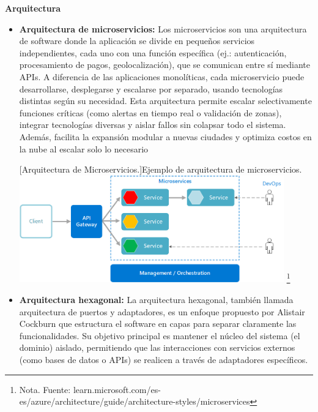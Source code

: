 \vspace{5mm}
\textbf{Arquitectura} 

\begin{itemize}
    \item\textbf{Arquitectura de microservicios: }Los microservicios son una arquitectura de software donde la aplicación se divide en pequeños servicios independientes, cada uno con una función específica (ej.: autenticación, procesamiento de pagos, geolocalización), que se comunican entre sí mediante APIs. A diferencia de las aplicaciones monolíticas, cada microservicio puede desarrollarse, desplegarse y escalarse por separado, usando tecnologías distintas según su necesidad.
        Esta arquitectura permite escalar selectivamente funciones críticas (como alertas en tiempo real o validación de zonas), integrar tecnologías diversas y aislar fallos sin colapsar todo el sistema. Además, facilita la expansión modular a nuevas ciudades y optimiza costos en la nube al escalar solo lo necesario
        \vspace{2mm}
        \begin{center}
        \begin{minipage}{0.9\textwidth}
            \centering
            [{Arquitectura de Microservicios.}]{Ejemplo de arquitectura de microservicios.}
            \label{microservicios}
            \includegraphics[width=0.9\textwidth]{Content/Images/microservices-logical.png}
            \footnote{Nota. \textup{Fuente: learn.microsoft.com/es-es/azure/architecture/guide/architecture-styles/microservices}}
        \end{minipage}
        \end{center}
        \item \textbf{Arquitectura hexagonal: } La arquitectura hexagonal, también llamada arquitectura de puertos y adaptadores, es un enfoque propuesto por Alistair Cockburn que estructura el software en capas para separar claramente las funcionalidades. Su objetivo principal es mantener el núcleo del sistema (el dominio) aislado, permitiendo que las interacciones con servicios externos (como bases de datos o APIs) se realicen a través de adaptadores específicos.


\end{itemize}
